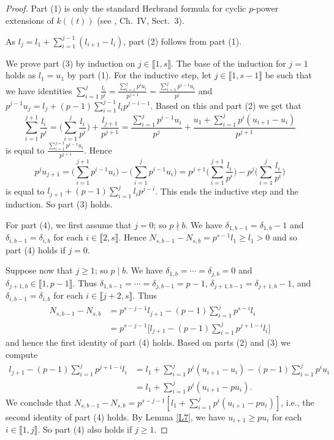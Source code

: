 \documentclass[11pt]{amsart}
\begin{document}
\begin{proof}
Part (1) is only the standard Herbrand formula for cyclic $p$-power extensions of $k((t))$ (see \cite{S}, Ch.\ IV, Sect.\ 3). 

As $l_j=l_1+\sum_{i=1}^{j-1} (l_{i+1}-l_i)$, part (2) follows from part (1).

We prove part (3) by induction on $j\in\llbracket1,s\rrbracket$. The base of the induction for $j=1$ holds as $l_1=u_1$ by part (1). For the inductive step, let $j\in\llbracket1,s-1\rrbracket$ be such that we have identities $\sum_{i=1}^j \frac{l_i}{p^i}=\frac{\sum_{i=1}^j p^iu_i}{p^{j+1}}=\frac{\sum_{i=1}^j p^{i-1}u_i}{p^{j}}$ and $p^{j-1}u_j=l_j+(p-1)\sum_{i=1}^{j-1}l_ip^{j-i-1}$. Based on this and part (2) we get that
$$\sum_{i=1}^{j+1} \frac{l_i}{p^i}=\Big(\sum_{i=1}^j \frac{l_i}{p^i}\Big)+\frac{l_{j+1}}{p^{j+1}}=\frac{\sum_{i=1}^j p^{i-1}u_i}{p^j}+\frac{u_1+\sum_{i=1}^j p^i(u_{i+1}-u_i)}{p^{j+1}}$$
is equal to $\frac{\sum_{i=1}^{j+1} p^{i-1}u_i}{p^{j+1}}$. Hence 
$$p^ju_{j+1}=\Big(\sum_{i=1}^{j+1} p^{i-1}u_i\Big)-\Big(\sum_{i=1}^j p^{i-1}u_i\Big)=p^{j+1}\Big(\sum_{i=1}^{j+1} \frac{l_i}{p^i})-p^j\Big(\sum_{i=1}^{j} \frac{l_i}{p^i}\big)$$ is equal to $l_{j+1}+(p-1)\sum_{i=1}^{j}l_ip^{j-i}$. This ends the inductive step and the induction. So part (3) holds.

For part (4), we first assume that $j=0$; so $p\nmid b$. We have $\delta_{1,b-1}=\delta_{1,b}-1$ and $\delta_{i,b-1}=\delta_{i,b}$ for each $i\in\llbracket2,s\rrbracket$. Hence $N_{s,b-1}-N_{s,b}=p^{s-1}l_1\ge l_1>0$ and so part (4) holds if $j=0$.

Suppose now that $j\ge 1$; so $p\mid b$. We have $\delta_{1,b}=\cdots=\delta_{j,b}=0$ and $\delta_{j+1,b}\in\llbracket1,p-1\rrbracket$. Thus $\delta_{1,b-1}=\cdots=\delta_{j,b-1}=p-1$, $\delta_{j+1,b-1}=\delta_{j+1,b}-1$, and $\delta_{i,b-1}=\delta_{i,b}$ for each $i\in\llbracket j+2,s\rrbracket$. Thus 
\begin{equation*}
\begin{aligned}
N_{s,b-1}-N_{s,b}&=p^{s-j-1}l_{j+1}-(p-1)\sum_{i=1}^j p^{s-i}l_i\\
&=p^{s-j-1}\Big[l_{j+1}-(p-1)\sum_{i=1}^j p^{j+1-i}l_i\Big]
\end{aligned}
\end{equation*}
and hence the first identity of part (4) holds.
Based on parts (2) and (3) we compute
\[
\begin{split}
l_{j+1}-(p-1)\sum_{i=1}^j p^{j+1-i}l_i
&=l_1+\sum_{i=1}^j p^i(u_{i+1}-u_i)
-(p-1)\sum_{i=1}^j p^iu_i\\
&=l_1+\sum_{i=1}^j p^i(u_{i+1}-pu_i).
\end{split}
\]
We conclude that 
$N_{s,b-1}-N_{s,b}=p^{s-j-1}[l_1+\sum_{i=1}^j p^i(u_{i+1}-pu_i)]$, i.e., the second identity of part (4) holds. By Lemma \ref{L7}, we have $u_{i+1}\ge pu_i$ for each $i\in\llbracket1,j\rrbracket$. So part (4) also holds if $j\ge 1$.
\end{proof}
\end{document}
